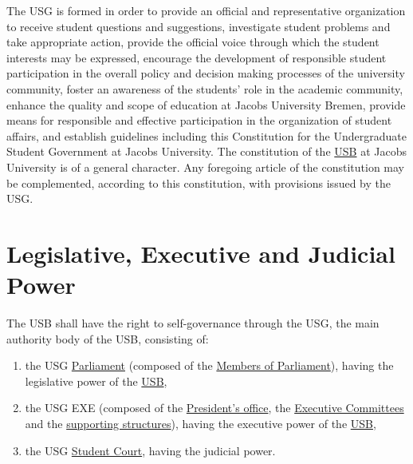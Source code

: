 The \ac{USG}\label{USGdef} is formed in order to provide an official and representative organization to receive student questions and suggestions, investigate student problems and take appropriate action, provide the official voice through which the student interests may be expressed, encourage the development of responsible student participation in the overall policy and decision making processes of the university community, foster an awareness of the students' role in the academic community, enhance the quality and scope of education at Jacobs University Bremen, provide means for responsible and effective participation in the organization of student affairs, and establish guidelines including this Constitution for the Undergraduate Student Government at Jacobs University. The constitution of the \hyperref[studentbody]{USB} at Jacobs University is of a general character. Any foregoing article of the constitution may be complemented, according to this constitution, with provisions issued by the USG.

\section{Legislative, Executive and Judicial Power} 
The \acf{USB}\label{USBdef} shall have the right to self-governance through the \acf{USG}, the main authority body of the USB, consisting of:
\begin{enumerate}
    \item the USG \hyperref[USGParliamentDef]{Parliament} \label{USGParliament} (composed of the \hyperref[MPDef]{Members of Parliament}), having the legislative power of the \hyperref[studentbody]{USB},
    \item the USG \acl{EXE} (composed of the \hyperref[PresidentOfficeDef]{President's office}, the \protect\hyperref[USGstructure]{Executive Committees} and the \hyperref[suppstrucdef]{supporting structures}), having the executive power of the \hyperref[studentbody]{USB},
    \item the USG \hyperref[StudentCourtDef]{Student Court}, having the judicial power.
\end{enumerate}



